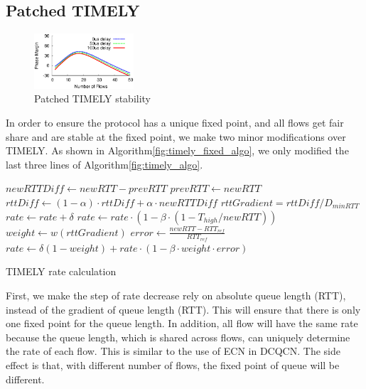 \subsection {Patched TIMELY}

\begin{figure}[t]
\center
\includegraphics[width=0.33\textwidth]{figures/timely_stability.eps}
\caption{Patched TIMELY stability}
\label{fig:timely_stability}
\end{figure}


In order to ensure the protocol has a unique fixed point, and all flows get fair share and are stable at the fixed point,
we make two minor modifications over TIMELY. As shown in Algorithm\ref{fig:timely_fixed_algo}, we only modified the last
three lines of Algorithm\ref{fig:timely_algo}.

\begin{algorithm}[t]
\footnotesize
{
\begin{algorithmic}[1]
\State $newRTTDiff \gets newRTT - prevRTT$
\State $prevRTT \gets newRTT$
\State $rttDiff \gets (1-\alpha) \cdot rttDiff + \alpha \cdot newRTTDiff$
\State $rttGradient = rttDiff/D_{minRTT}$
        \State $rate \gets rate + \delta$
        \State $rate \gets rate \cdot  (1 - \beta \cdot (1 - T_{high}/newRTT))$
\Else
		\State $weight \gets w(rttGradient)$	
		\State $error \gets \frac{{newRTT - RT{T_{ref}}}}{{RT{T_{ref}}}}$
        \State $rate \gets \delta (1-weight) +  rate \cdot (1 - \beta \cdot weight  \cdot error)$
\EndIf 
\end{algorithmic}
}
\caption{TIMELY rate calculation}
\label{fig:timely_fixed_algo}
\end{algorithm}


First, we make the step of rate decrease rely on absolute queue length (RTT), instead of the gradient of queue length (RTT). 
This will ensure that there is only one fixed point for the queue length. In addition, all flow will have the same rate 
because the queue length, which is shared across flows, can uniquely determine the rate of each flow. This is 
similar to the use of ECN in DCQCN. The side effect is that, with different number of flows, the fixed point of 
queue will be different.

